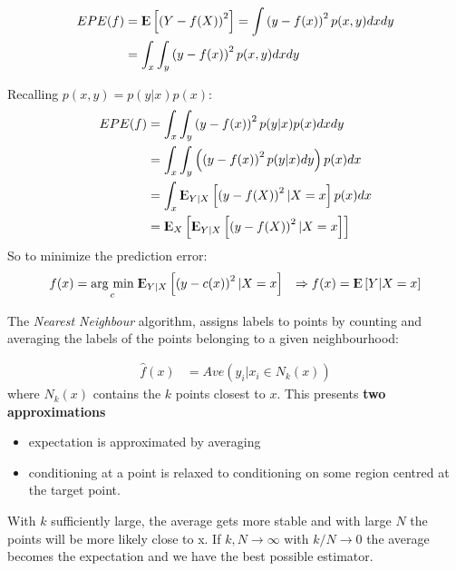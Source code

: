 \documentclass[12pt, letterpaper]{article}
\theoremstyle{definition}
\newcommand{\E}{{\rm I\kern-.3em E}}
\newcommand{\argmin}[1]{\underset{#1}{\operatorname{arg}\,\operatorname{min}}\;}
\begin{document}
\begin{equation}
\begin{aligned}
EPE(f) &= \E\left[ \left( Y- f(X) \right)^2 \right] = \int \left( y- f(x) \right)^2 p(x,y) dx dy \\
&= \int_x\int_y \left( y- f(x) \right)^2 p(x,y) dx dy \\
\end{aligned}
\end{equation}

Recalling $p(x,y) = p( y|x) p(x)$:
\begin{equation}
\begin{aligned}
EPE(f) &= \int_x\int_y \left( y- f(x) \right)^2 p(y|x)  p(x) dx dy \\
 &= \int_x \int_y \left( \left( y - f(x) \right)^2 p(y|x) dy\right)  p(x) dx   \\
 &= \int_x \E_{Y|X} \left[ \left( y - f(X) \right)^2 | X=x \right]  p(x) dx   \\
 &= \E_X \left[ \E_{Y|X} \left[ \left( y - f(X) \right)^2 | X=x \right]    \right]   
\end{aligned}
\end{equation}
So to minimize the prediction error:
\begin{align}
f(x) &= \argmin{c} \E_{Y|X} \left[ \left( y - c(x) \right)^2 | X=x \right] 
& \Rightarrow f(x) = \E \left[ Y | X=x \right] 
\end{align}

The \textit{Nearest Neighbour} algorithm, assigns labels to points by counting and averaging the labels of the points belonging to a given neighbourhood:

\begin{align}
\hat{f} (x) &= Ave \left(   y_i|x_i \in N_k(x)   \right)
\end{align}
where $N_k(x) $ contains the $k$ points closest to $x$. This presents \textbf{two approximations}
\begin{itemize}
\item expectation is approximated by averaging
\item conditioning at a point is relaxed to conditioning on some region centred at the target point.
\end{itemize}

With $k$ sufficiently large, the average gets more stable and with large $N$ the points will be more likely close to x. If $k, N \rightarrow \infty$ with $k/N \rightarrow 0$ the average becomes the expectation and we have the best possible estimator.
\end{document}
